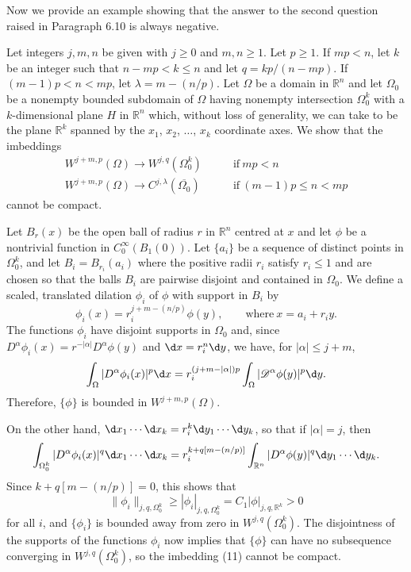 Now we provide an example showing that the answer to the second question
raised in Paragraph 6.10 is always negative.

\begin{example}
  Let integers $j,m,n$ be given with $j\geq 0$ and $m,n\geq 1$.
  Let $p\geq 1$. If $mp<n$, let $k$ be an integer such that $n-mp<k\leq n$
  and let $q=kp/(n-mp)$. If $(m-1)p<n<mp$, let $\lambda=m-(n/p)$. Let $\Omega$
  be a domain in $\mathbb{R}^n$ and let $\Omega_0$ be a nonempty bounded subdomain
  of $\Omega$ having nonempty intersection $\Omega_0^k$ with a $k$-dimensional
  plane $H$ in $\mathbb{R}^n$ which, without loss of generality, we can take
  to be the plane $\mathbb{R}^k$ spanned by the $x_1$, $x_2$, $\ldots$, $x_k$
  coordinate axes. We show that the imbeddings
  \begin{align}
    W^{j+m,p}(\Omega) \to W^{j,q}(\Omega_0^k) \qquad & \text{if}\ mp<n \\
    W^{j+m,p}(\Omega) \to C^{j,\lambda}(\overline{\Omega_0}) \qquad & \text{if}\ (m-1)p\leq n<mp
  \end{align}
  cannot be compact.

  Let $B_r(x)$ be the open ball of radius $r$ in $\mathbb{R}^n$ centred at $x$
  and let $\phi$ be a nontrivial function in $C_0^\infty(B_1(0))$.
  Let $\{a_i\}$ be a sequence of distinct points in $\Omega_0^k$,
  and let $B_i=B_{r_i}(a_i)$ where the positive radii $r_i$ satisfy $r_i\leq 1$
  and are chosen so that the balls $B_i$ are pairwise disjoint and contained in $\Omega_0$.
  We define a scaled, translated dilation $\phi_i$ of $\phi$ with support in $B_i$ by
  \[\phi_i(x) = r_i^{j+m-(n/p)}\phi(y), \qquad \text{where}\ x = a_i+r_iy.\]
  The functions $\phi_i$ have disjoint supports in $\Omega_0$ and, since
  $D^\alpha \phi_i(x) = r^{-|\alpha|} D^\alpha \phi(y)$ and $\d x = r_i^n \d y$,
  we have, for $|\alpha|\leq j+m$,
  \[\int_\Omega |D^\alpha\phi_i(x)|^p \d x
    = r_i^{(j+m-|\alpha|)p}\int_\Omega |\mathscr{D}^\alpha \phi(y)|^p \d y.\]
  Therefore, $\{\phi\}$ is bounded in $W^{j+m,p}(\Omega)$.

  On the other hand, $\d x_1\cdots\d x_k = r_i^k \d y_1\cdots \d y_k$,
  so that if $|\alpha|=j$, then
  \[\int_{\Omega_0^k} |D^\alpha\phi_i(x)|^q \d x_1\cdots\d x_k
    = r_i^{k+q[m-(n/p)]} \int_{\mathbb{R}^n} |D^\alpha\phi(y)|^q \d y_1\cdots\d y_k.\]
  Since $k+q[m-(n/p)] = 0$, this shows that
  \[\|\phi_i\|_{j,q,\Omega_0^k} \geq |\phi_i|_{j,q,\Omega_0^k} = C_1 |\phi|_{j,q,\mathbb{R}^k} > 0\]
  for all $i$, and $\{\phi_i\}$ is bounded away from zero in $W^{j,q}(\Omega_0^k)$.
  The disjointness of the supports of the functions $\phi_i$ now implies that
  $\{\phi\}$ can have no subsequence converging in $W^{j,q}(\Omega_0^k)$,
  so the imbedding (11) cannot be compact.


\end{example}
